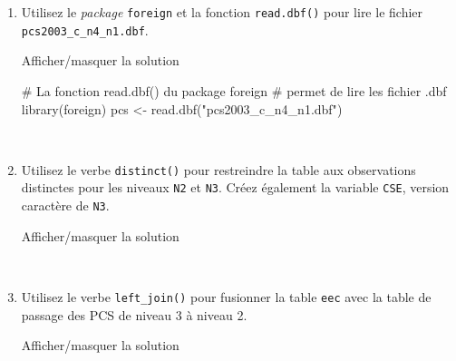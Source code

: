 \documentclass[12pt,]{article}
\newenvironment{Shaded}{}{}
\newcommand{\KeywordTok}[1]{\textcolor[rgb]{0.00,0.00,1.00}{{#1}}}
\newcommand{\DataTypeTok}[1]{{#1}}
\newcommand{\StringTok}[1]{\textcolor[rgb]{0.00,0.50,0.50}{{#1}}}
\newcommand{\CommentTok}[1]{\textcolor[rgb]{0.00,0.50,0.00}{{#1}}}
\newcommand{\NormalTok}[1]{{#1}}
\begin{document}
\begin{enumerate}
\def\labelenumi{\alph{enumi}.}
\item
  Utilisez le \emph{package} \texttt{foreign} et la fonction
  \texttt{read.dbf()} pour lire le fichier
  \texttt{pcs2003\_c\_n4\_n1.dbf}.

  Afficher/masquer la solution

  \hypertarget{sol55}{}
\begin{Shaded}
\begin{Highlighting}[]
\CommentTok{# La fonction read.dbf() du package foreign}
\CommentTok{# permet de lire les fichier .dbf}
\KeywordTok{library}\NormalTok{(foreign)}
\NormalTok{pcs <-}\StringTok{ }\KeywordTok{read.dbf}\NormalTok{(}\StringTok{"pcs2003_c_n4_n1.dbf"}\NormalTok{)}
\end{Highlighting}
\end{Shaded}

  ~
\item
  Utilisez le verbe \texttt{distinct()} pour restreindre la table aux
  observations distinctes pour les niveaux \texttt{N2} et \texttt{N3}.
  Créez également la variable \texttt{CSE}, version caractère de
  \texttt{N3}.

  Afficher/masquer la solution

  \hypertarget{sol56}{}
\begin{Shaded}
\end{Shaded}

  ~
\item
  Utilisez le verbe \texttt{left\_join()} pour fusionner la table
  \texttt{eec} avec la table de passage des PCS de niveau 3 à niveau 2.

  Afficher/masquer la solution

  \hypertarget{sol57}{}
\begin{Shaded}
\end{Shaded}


\end{enumerate}
\end{document}
